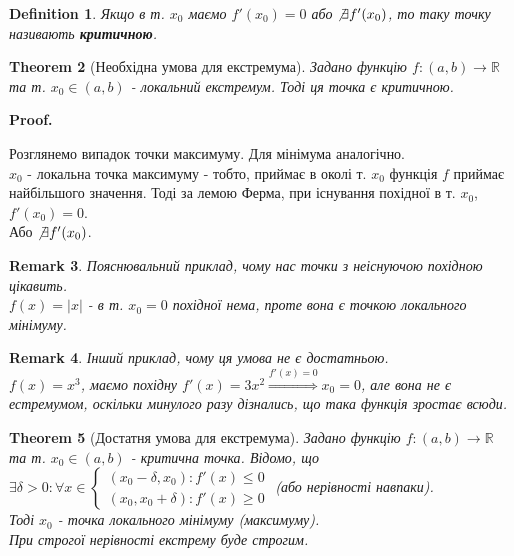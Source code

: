 \documentclass[a4paper, 14pt]{article}
\makeatletter
\def\qed{$\blacksquare$}
\theoremstyle{theoremdd}
\newtheorem{theorem}{Theorem}[subsection]
\theoremstyle{theoremdd}
\newtheorem{definition}[theorem]{Definition}
\theoremstyle{theoremdd}
\theoremstyle{theoremdd}
\theoremstyle{theoremdd}
\theoremstyle{theoremdd}
\newtheorem{remark}[theorem]{Remark}
\theoremstyle{theoremdd}
\theoremstyle{theoremdd}
\renewenvironment{proof}[1][Proof.\\]{\par
\pushQED{\hfill \qed}%
\normalfont \topsep6\p@\@plus6\p@\relax
\trivlist
\item\relax
{\bfseries
#1\@addpunct{.}}\hspace\labelsep\ignorespaces
}{%
\popQED\endtrivlist\@endpefalse
}
\makeatother
\begin{document}
\begin{definition}
Якщо в т. $x_0$ маємо $f'(x_0) = 0$ або $\not\exists f'(x_0)$, то таку точку називають \textbf{критичною}.
\end{definition}

\begin{theorem}[Необхідна умова для екстремума]
Задано функцію $f: (a,b) \to \mathbb{R}$ та т. $x_0 \in (a,b)$ - локальний екстремум. Тоді ця точка є критичною.\\
\end{theorem}

\begin{proof}
Розглянемо випадок точки максимуму. Для мінімума аналогічно.\\
$x_0$ - локальна точка максимуму - тобто, приймає в околі т. $x_0$ функція $f$ приймає найбільшого значення. Тоді за лемою Ферма, при існування похідної в т. $x_0$, $f'(x_0) = 0$.\\
Або $\not\exists f'(x_0)$.
\end{proof}

\begin{remark}
Пояснювальний приклад, чому нас точки з неіснуючою похідною цікавить.\\
$f(x) = |x|$ - в т. $x_0 = 0$ похідної нема, проте вона є точкою локального мінімуму.
\end{remark}

\begin{remark}
Інший приклад, чому ця умова не є достатньою.\\
$f(x) = x^3$, маємо похідну $f'(x) = 3x^2 \overset{f'(x) = 0}{\Rightarrow} x_0 = 0$, але вона не є естремумом, оскільки минулого разу дізнались, що така функція зростає всюди.
\end{remark}

\begin{theorem}[Достатня умова для екстремума]
Задано функцію $f: (a,b) \to \mathbb{R}$ та т. $x_0 \in (a,b)$ - критична точка. Відомо, що \\ $\exists \delta > 0: \forall x \in \begin{cases} (x_0-\delta,x_0): f'(x) \leq 0 \\ (x_0,x_0+\delta): f'(x) \geq 0 \end{cases}$ (або нерівності навпаки).\\
Тоді $x_0$ - точка локального мінімуму (максимуму).\\
При строгої нерівності екстрему буде строгим.
\end{theorem}
\end{document}
